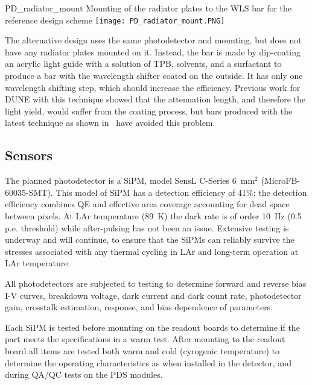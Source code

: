 \begin{cdrfigure}{PD_radiator_mount}
  {Mounting of the radiator plates to the WLS bar for the reference design scheme}
\texttt{[image: PD\_radiator\_mount.PNG]}
\end{cdrfigure}

The alternative design uses the same photodetector and mounting, but does not have
any radiator plates mounted on it.  
Instead, the bar is made by dip-coating an acrylic light guide with a solution
of TPB, solvents, and a surfactant to produce a bar with the wavelength shifter coated
on the outside.  
It has only one wavelength shifting step, which should increase the efficiency.  
Previous work for DUNE with this technique showed that the attenuation length, and
therefore the light yield, would suffer from the coating process, but bars produced with
the latest technique as shown in~\cite{conrad_jinst2015} have %
avoided this problem.




\subsection{Sensors}
The planned photodetector is a SiPM, model 
SensL C-Series 6~mm$^2$
(MicroFB-60035-SMT). %
This model of SiPM has a detection efficiency of
41\%; the detection efficiency combines QE and effective area
  coverage accounting for dead space between pixels.   At LAr temperature (89~K) the dark rate is of order 10~Hz
(0.5 p.e. threshold) while after-pulsing has not been an
issue. Extensive testing is underway and will continue, to ensure 
that the SiPMs can reliably survive the stresses associated with 
any thermal cycling in LAr and long-term operation at LAr temperature.

All photodetectors %
are subjected to testing to determine
 forward and reverse bias I-V curves,
 breakdown voltage, dark current and dark count rate, photodetector gain, crosstalk estimation, response, and bias dependence of parameters.
 
Each SiPM is tested before mounting on the readout boards to determine
if the part meets the specifications in a warm test.  After mounting to
the readout board all items are tested both warm and cold (cyrogenic 
temperature) to determine the operating characteristics as when %
installed in the %
detector, and during QA/QC tests on the PDS modules.

